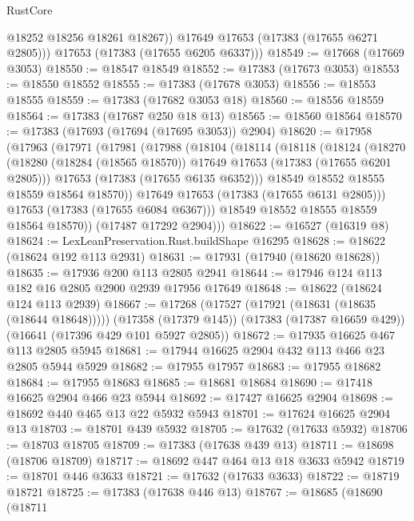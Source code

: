 \begin{lexlean}{RustCore}
\begin{coremodule}
            @18252
            @18256
            @18261
            @18267))
        @17649
        @17653
        (@17383 (@17655 @6271 @2805)))
      @17653
      (@17383 (@17655 @6205 @6337)))
@18549 := @17668 (@17669 @3053)
@18550 := @18547 @18549
@18552 := @17383 (@17673 @3053)
@18553 := @18550 @18552
@18555 := @17383 (@17678 @3053)
@18556 := @18553 @18555
@18559 := @17383 (@17682 @3053 @18)
@18560 := @18556 @18559
@18564 := @17383 (@17687 @250 @18 @13)
@18565 := @18560 @18564
@18570 := @17383 (@17693 (@17694 (@17695 @3053)) @2904)
@18620 := @17958
    (@17963
      (@17971
        (@17981
          (@17988
            (@18104
              (@18114
                (@18118
                  (@18124
                    (@18270
                      (@18280 (@18284 (@18565 @18570)) @17649 @17653 (@17383 (@17655 @6201 @2805)))
                      @17653
                      (@17383 (@17655 @6135 @6352)))
                    @18549
                    @18552
                    @18555
                    @18559
                    @18564
                    @18570))
                @17649
                @17653
                (@17383 (@17655 @6131 @2805)))
              @17653
              (@17383 (@17655 @6084 @6367)))
            @18549
            @18552
            @18555
            @18559
            @18564
            @18570))
        (@17487 @17292 @2904)))
@18622 := @16527 (@16319 @8)
@18624 := LexLeanPreservation.Rust.buildShape @16295
@18628 := @18622 (@18624 @192 @113 @2931)
@18631 := @17931 (@17940 (@18620 @18628))
@18635 := @17936 @200 @113 @2805 @2941
@18644 := @17946 @124 @113 @182 @16 @2805 @2900 @2939 @17956 @17649
@18648 := @18622 (@18624 @124 @113 @2939)
@18667 := @17268
    (@17527 (@17921 (@18631 (@18635 (@18644 @18648)))))
    (@17358 (@17379 @145))
    (@17383 (@17387 @16659 @429))
    (@16641 (@17396 @429 @101 @5927 @2805))
@18672 := @17935 @16625 @467 @113 @2805 @5945
@18681 := @17944 @16625 @2904 @432 @113 @466 @23 @2805 @5944 @5929
@18682 := @17955 @17957
@18683 := @17955 @18682
@18684 := @17955 @18683
@18685 := @18681 @18684
@18690 := @17418 @16625 @2904 @466 @23 @5944
@18692 := @17427 @16625 @2904
@18698 := @18692 @440 @465 @13 @22 @5932 @5943
@18701 := @17624 @16625 @2904 @13
@18703 := @18701 @439 @5932
@18705 := @17632 (@17633 @5932)
@18706 := @18703 @18705
@18709 := @17383 (@17638 @439 @13)
@18711 := @18698 (@18706 @18709)
@18717 := @18692 @447 @464 @13 @18 @3633 @5942
@18719 := @18701 @446 @3633
@18721 := @17632 (@17633 @3633)
@18722 := @18719 @18721
@18725 := @17383 (@17638 @446 @13)
@18767 := @18685
    (@18690
      (@18711

\end{coremodule}
\end{lexlean}
